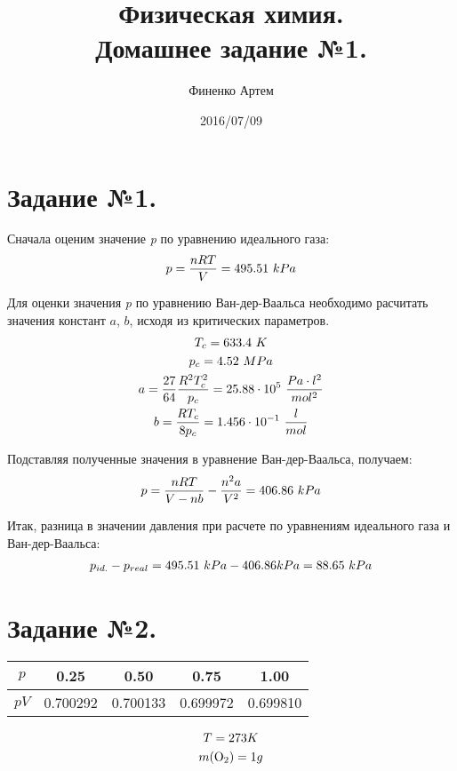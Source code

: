 \documentclass[a4paper]{article}
\title{Физическая химия.  \\ Домашнее задание №1.}
\author{Финенко Артем}
\date{2016/07/09}
\begin{document}
\maketitle

\section{Задание №1.}
Сначала оценим значение \textit{p} по уравнению идеального газа:
\begin{gather}
p = \frac{n R T}{V} = 495.51 \ kPa \notag
\end{gather}

Для оценки значения \textit{p} по уравнению Ван-дер-Ваальса необходимо расчитать значения констант $a$, $b$, исходя из критических параметров.
\begin{gather}
T_c = 633.4 \ K \notag \\
p_c = 4.52 \ MPa \notag \\ 
a = \frac{27}{64} \frac{R^2 T_c^2}{p_c} = 25.88 \cdot 10^5 \  \frac{Pa \cdot l^2}{mol^2} \notag \\
b = \frac{R T_c}{8 p_c} = 1.456 \cdot 10^{-1} \ \frac{l}{mol} \notag 
\end{gather}

Подставляя полученные значения в уравнение Ван-дер-Ваальса, получаем:
\begin{gather}
p = \frac{nRT}{V-nb} - \frac{n^2 a}{V^2} = 406.86 \ kPa \notag
\end{gather}

Итак, разница в значении давления при расчете по уравнениям идеального газа и Ван-дер-Ваальса:
\begin{gather}
p_{id.} - p_{real} = 495.51 \ kPa - 406.86 kPa = 88.65 \ kPa \notag
\end{gather}

\section{Задание №2.}

\begin{center}
\begin{tabular}{|*5{c|}}
\hline
$p$ & 0.25 & 0.50 & 0.75 & 1.00 \\ \hline
$pV$ & 0.700292 & 0.700133 & 0.699972 & 0.699810 \\ \hline
\end{tabular}
\end{center}

\begin{gather}
T = 273 K \notag \\
m (\ce{O}_2) = 1 g \notag
\end{gather}
\end{document}
